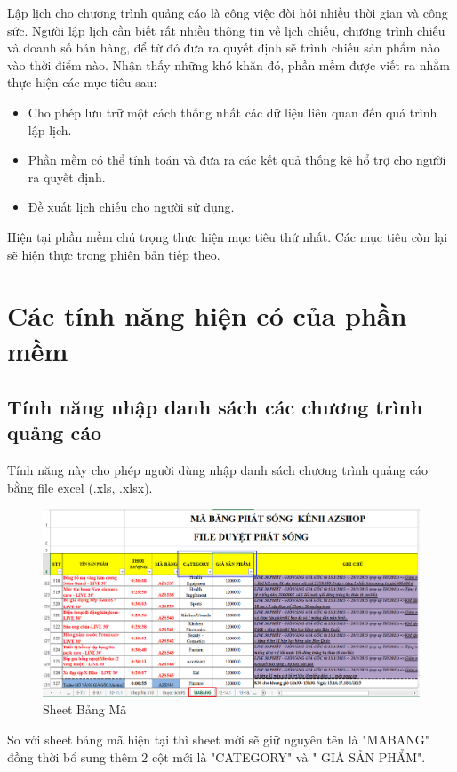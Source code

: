 \documentclass[11pt]{article}
\begin{document}
\indent Lập lịch cho chương trình quảng cáo là công việc đòi hỏi nhiều thời gian và công sức. Người lập lịch cần biết rất nhiều thông tin về lịch chiếu, chương trình chiếu và doanh số bán hàng, để từ đó đưa ra quyết định sẽ trình chiếu sản phẩm nào vào thời điểm nào. Nhận thấy những khó khăn đó, phần mềm được viết ra nhằm thực hiện các mục tiêu sau:
\begin{itemize}
	\item Cho phép lưu trữ một cách thống nhất các dữ liệu liên quan đến quá trình lập lịch.
	\item Phần mềm có thể tính toán và đưa ra các kết quả thống kê hổ trợ cho người ra quyết định.
	\item Đề xuất lịch chiếu cho người sử dụng.
\end{itemize}
\indent Hiện tại phần mềm chú trọng thực hiện mục tiêu thứ nhất. Các mục tiêu còn lại sẽ hiện thực trong phiên bản tiếp theo.

\section{Các tính năng hiện có của phần mềm}

\subsection{Tính năng nhập danh sách các chương trình quảng cáo}
\indent Tính năng này cho phép người dùng nhập danh sách chương trình quảng cáo bằng file excel (.xls, .xlsx).\\
\begin{figure}[h!]
	\begin{center}
		\includegraphics[width=17cm]{mabang.png}
	\end{center}
	\caption{Sheet Bảng Mã}
	\label{bangma}
\end{figure}
\indent So với sheet bảng mã hiện tại thì sheet mới sẽ giữ nguyên tên là "MABANG" đồng thời bổ sung thêm 2 cột mới là "CATEGORY" và " GIÁ SẢN PHẨM".
\end{document}
